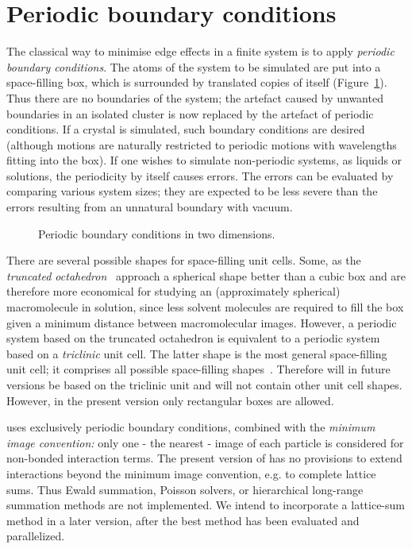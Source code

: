 \section{Periodic boundary conditions}
\label{sec:pbc}
The classical way to minimise edge effects in a finite system is to
apply {\em periodic boundary conditions}. The atoms of the system to be simulated are put into a space-filling box, which is
surrounded by translated copies of itself (Figure~\ref{fig:pbc}). 
Thus there are no
boundaries of the system; the artefact caused by unwanted
boundaries in an isolated cluster is now replaced by the artefact of
periodic conditions. If a crystal is simulated, such boundary conditions
are desired (although motions are naturally restricted to periodic
motions with wavelengths fitting into the box). If one wishes to
simulate  non-periodic systems, as liquids or solutions, the
periodicity by  itself causes errors. The errors can be evaluated by
comparing various system sizes; they are expected to be less severe than
the errors resulting from an unnatural boundary with vacuum.
\begin {figure}
\centerline{}
\caption {Periodic boundary conditions in two dimensions.}
\label{fig:pbc}
\end {figure}

There are several possible shapes for space-filling unit cells. Some,
as the {\em truncated octahedron}~\cite{Adams79} approach a spherical
shape better than a cubic box and are therefore more economical for
studying an (approximately spherical) macromolecule in solution, since
less solvent molecules are required to fill the box given a minimum
distance between macromolecular images. However, a periodic system
based on the truncated octahedron is equivalent to a periodic system
based on a {\em triclinic} unit cell. The latter shape is the most
general space-filling unit cell; it comprises all possible
space-filling shapes~\cite{Bekker95}. Therefore {\gromacs} will in
future versions be based on the triclinic unit and will not contain
other unit cell shapes. However, in the present version
only rectangular boxes are allowed.
  

\gromacs uses exclusively periodic boundary conditions, combined
with the {\em minimum image convention:} only one - the nearest -
image of each particle is considered for non-bonded interaction terms.
The present version of \gromacs has no provisions to extend
interactions beyond the minimum image convention, e.g. to complete
lattice sums. Thus Ewald summation, Poisson solvers, or hierarchical
long-range summation methods are not implemented. We intend to
incorporate a lattice-sum method in a later version, after the best
method has been evaluated and parallelized.
  
